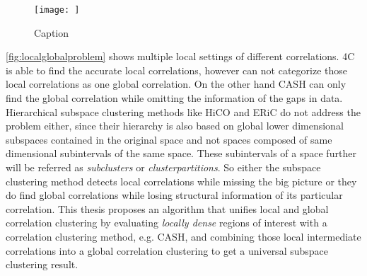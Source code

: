 \begin{figure}
    \centering
    \texttt{[image: ]}
    \caption{Caption}
    \label{fig:localglobalproblem}
\end{figure}

\autoref{fig:localglobalproblem}  shows multiple local settings of different correlations. \ac{4C} is able to find the accurate local correlations, however can not categorize those local correlations as one global correlation. 
On the other hand CASH can only find the global correlation while omitting the information of the gaps in data. Hierarchical subspace clustering methods like \ac{HiCO} and \ac{ERiC} do not address the problem either, since their hierarchy is also based on global lower dimensional subspaces contained in the original space and not spaces composed of same dimensional subintervals of the same space. These subintervals of a space further will be referred as \textit{subclusters} or \textit{clusterpartitions}.
So either the subspace clustering method detects local correlations while missing the big picture or they do find global correlations while losing structural information of its particular correlation. This thesis proposes an algorithm that unifies local and global correlation clustering by evaluating \textit{locally dense} regions of interest with a correlation clustering method, e.g. \ac{CASH}, and combining those local intermediate correlations into a global correlation clustering to get a universal subspace clustering result. 


